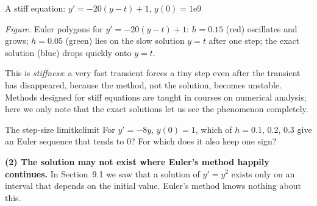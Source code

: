 \documentclass[11pt]{article}
\begin{document}
\begin{exmp}{A stiff equation: $y'=-20(y-t)+1$, $y(0)=1$}{e9}
\begin{center}
\par\small\emph{Figure.} Euler polygons for $y'=-20(y-t)+1$: $h=0.15$ (red) oscillates and grows; $h=0.05$ (green) lies on the slow solution $y=t$ after one step; the exact solution (blue) drops quickly onto $y=t$.
\end{center}
This is \emph{stiffness}: a very fast transient forces a tiny step even after the transient has disappeared, because the method, not the solution, becomes unstable. Methods designed for stiff equations are taught in courses on numerical analysis; here we only note that the exact solutions let us see the phenomenon completely.
\end{exmp}

\begin{kc}{The step-size limit}{kclimit}
For $y'=-8y$, $y(0)=1$, which of $h=0.1$, $0.2$, $0.3$ give an Euler sequence that tends to $0$? For which does it also keep one sign?
\end{kc}

\textbf{(2) The solution may not exist where Euler's method happily continues.} In Section~9.1 we saw that a solution of $y'=y^2$ exists only on an interval that depends on the initial value. Euler's method knows nothing about this.
\end{document}
